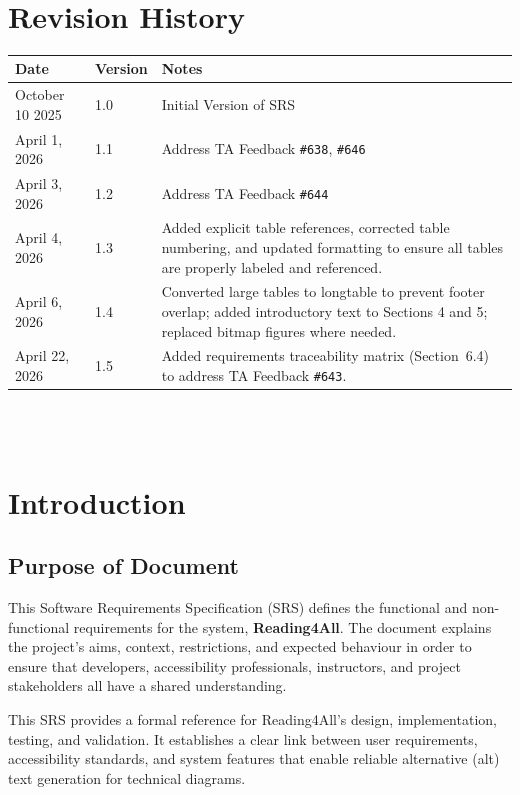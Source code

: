 \documentclass[12pt]{article}
\begin{document}
\begin{longtable}{p{}p{}}
\bottomrule
\end{longtable}
    


~\newpage

\section{Revision History}

\begin{tabularx}{\textwidth}{p{3cm}p{2cm}X}
\toprule {\textbf{Date}} & {\textbf{Version}} & {\textbf{Notes}}\\
\midrule
October 10 2025 & 1.0 & Initial Version of SRS\\
April 1, 2026 & 1.1 & Address TA Feedback \texttt{\#638}, \texttt{\#646} \\
April 3, 2026 & 1.2 & Address TA Feedback \texttt{\#644}\\
April 4, 2026 & 1.3 & Added explicit table references, corrected table numbering, and updated formatting to ensure all tables are properly labeled and referenced. \\
April 6, 2026 & 1.4 & Converted large tables to longtable to prevent footer overlap; added introductory text to Sections 4 and 5; replaced bitmap figures where needed. \\
April 22, 2026 & 1.5 & Added requirements traceability matrix (Section~6.4) to address TA Feedback \texttt{\#643}. \\
\bottomrule
\end{tabularx}

~\\

~\newpage
\section{Introduction}

\subsection{Purpose of Document}
This Software Requirements Specification (SRS) defines the functional
and non-functional requirements for the \progname{} system,
\textbf{Reading4All}. The document explains the project's aims,
context, restrictions, and expected behaviour in order to ensure that
developers, accessibility professionals, instructors, and project
stakeholders all have a shared understanding.

This SRS provides a formal reference for Reading4All's design,
implementation, testing, and validation. It establishes a clear link
between user requirements, accessibility standards, and system features that enable reliable alternative (alt) text
generation for technical diagrams.
\end{document}
